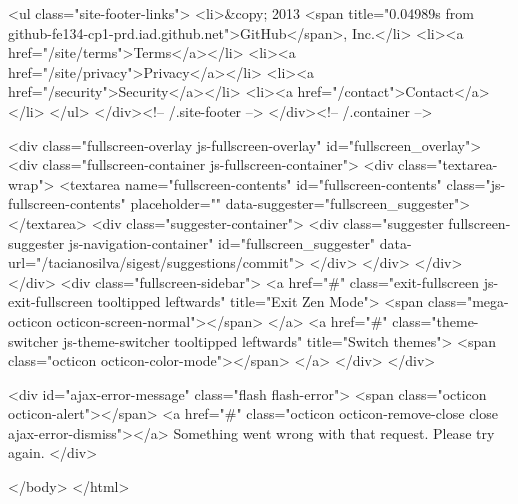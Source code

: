     <ul class="site-footer-links">
      <li>&copy; 2013 <span title="0.04989s from github-fe134-cp1-prd.iad.github.net">GitHub</span>, Inc.</li>
        <li><a href="/site/terms">Terms</a></li>
        <li><a href="/site/privacy">Privacy</a></li>
        <li><a href="/security">Security</a></li>
        <li><a href="/contact">Contact</a></li>
    </ul>
  </div><!-- /.site-footer -->
</div><!-- /.container -->


    <div class="fullscreen-overlay js-fullscreen-overlay" id="fullscreen_overlay">
  <div class="fullscreen-container js-fullscreen-container">
    <div class="textarea-wrap">
      <textarea name="fullscreen-contents" id="fullscreen-contents" class="js-fullscreen-contents" placeholder="" data-suggester="fullscreen_suggester"></textarea>
          <div class="suggester-container">
              <div class="suggester fullscreen-suggester js-navigation-container" id="fullscreen_suggester"
                 data-url="/tacianosilva/sigest/suggestions/commit">
              </div>
          </div>
    </div>
  </div>
  <div class="fullscreen-sidebar">
    <a href="#" class="exit-fullscreen js-exit-fullscreen tooltipped leftwards" title="Exit Zen Mode">
      <span class="mega-octicon octicon-screen-normal"></span>
    </a>
    <a href="#" class="theme-switcher js-theme-switcher tooltipped leftwards"
      title="Switch themes">
      <span class="octicon octicon-color-mode"></span>
    </a>
  </div>
</div>



    <div id="ajax-error-message" class="flash flash-error">
      <span class="octicon octicon-alert"></span>
      <a href="#" class="octicon octicon-remove-close close ajax-error-dismiss"></a>
      Something went wrong with that request. Please try again.
    </div>

  </body>
</html>

